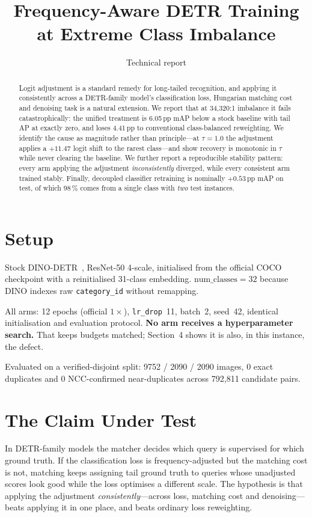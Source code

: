 \documentclass[11pt,letterpaper]{article}
\title{\bfseries Frequency-Aware DETR Training at Extreme Class Imbalance}
\author{Technical report}
\date{}
\begin{document}
\maketitle

\begin{abstract}
\noindent
Logit adjustment is a standard remedy for long-tailed recognition, and applying
it consistently across a DETR-family model's classification loss, Hungarian
matching cost and denoising task is a natural extension. We report that at
34{,}320:1 imbalance it fails catastrophically: the unified treatment is
6.05\,pp mAP below a stock baseline with tail AP at exactly zero, and loses
4.41\,pp to conventional class-balanced reweighting. We identify the cause as
magnitude rather than principle---at $\tau=1.0$ the adjustment applies a
$+11.47$ logit shift to the rarest class---and show recovery is monotonic in
$\tau$ while never clearing the baseline. We further report a reproducible
stability pattern: every arm applying the adjustment \emph{inconsistently}
diverged, while every consistent arm trained stably. Finally, decoupled
classifier retraining is nominally $+0.53$\,pp mAP on test, of which 98\,\%
comes from a single class with \emph{two} test instances.
\end{abstract}

\section{Setup}

Stock DINO-DETR~\cite{zhang2023dino}, ResNet-50 4-scale, initialised from the
official COCO checkpoint with a reinitialised 31-class embedding.
$\mathrm{num\_classes}=32$ because DINO indexes raw \texttt{category\_id}
without remapping.

All arms: 12 epochs (official $1\times$), \texttt{lr\_drop}~11, batch~2,
seed~42, identical initialisation and evaluation protocol. \textbf{No arm
receives a hyperparameter search.} That keeps budgets matched; Section~4 shows
it is also, in this instance, the defect.

Evaluated on a verified-disjoint split: 9752 / 2090 / 2090 images, 0 exact
duplicates and 0 NCC-confirmed near-duplicates across 792{,}811 candidate pairs.

\section{The Claim Under Test}

In DETR-family models the matcher decides which query is supervised for which
ground truth. If the classification loss is frequency-adjusted but the matching
cost is not, matching keeps assigning tail ground truth to queries whose
unadjusted scores look good while the loss optimises a different scale. The
hypothesis is that applying the adjustment \emph{consistently}---across loss,
matching cost and denoising---beats applying it in one place, and beats ordinary
loss reweighting.
\end{document}
